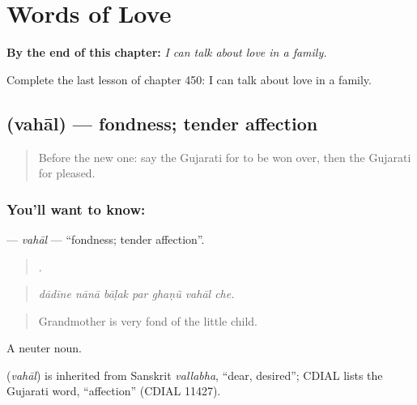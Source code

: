 
\chapter{Words of Love}
\label{ch:gu-words-of-love}

\begin{chapteropening}
\textbf{By the end of this chapter:} \emph{I can talk about love in a family.}

Complete the last lesson of chapter 450: I can talk about love in a family.
\end{chapteropening}

\section[\texorpdfstring{\gu{વહાલ} (vahāl)}{વહાલ (vahāl)}]{ (vahāl) — fondness; tender affection}

\label{lesson:GU-C450-vahal}



\begin{quote}
Before the new one: say the Gujarati for to be won over, then the Gujarati for pleased.
\end{quote}

\subsection*{You'll want to know: }
\textbf{} — \emph{vahāl} — \textquotedblleft{}fondness; tender affection\textquotedblright{}.

\begin{quote}
      .
\end{quote}

\begin{quote}
\emph{dādīne nānā bāḷak par ghaṇũ vahāl che.}
\end{quote}

\begin{quote}
Grandmother is very fond of the little child.
\end{quote}

A neuter noun.

\begin{cousinweb}
\textbf{} (\emph{vahāl}) is inherited from Sanskrit \emph{vallabha}, \textquotedblleft{}dear, desired\textquotedblright{}; CDIAL lists the Gujarati word, \textquotedblleft{}affection\textquotedblright{} (CDIAL 11427).
\end{cousinweb}

